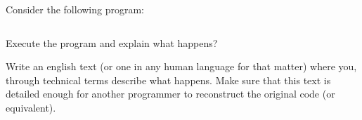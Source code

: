 Consider the following program:

\inputminted{csharp}{\context/question/AvgAge.cs}

Execute the program and explain what happens?

Write an english text (or one in any human language for that matter) where you, through technical terms describe what happens. Make sure that this text is detailed enough for another programmer to reconstruct the original code (or equivalent).
